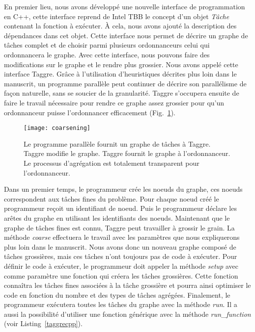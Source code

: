 En premier lieu, nous avons développé une nouvelle interface de programmation en C++, cette interface reprend de Intel TBB le concept d'un objet {\em Tâche} contenant la fonction à exécuter.
%
\`A cela, nous avons ajouté la description des dépendances dans cet objet.
%
Cette interface nous permet de décrire un graphe de tâches complet et de choisir parmi plusieurs ordonnanceurs celui qui ordonnancera le graphe.
%
Avec cette interface, nous pouvons faire des modifications sur le graphe et le rendre plus grossier.
%
Nous avons appelé cette interface Taggre.
%
Grâce à l'utilisation d'heuristiques décrites plus loin dans le manuscrit, un programme parallèle peut continuer de décrire son parallélisme de façon naturelle, sans se soucier de la granularité.
%
Taggre s'occupera ensuite de faire le travail nécessaire pour rendre ce graphe assez grossier pour qu'un ordonnanceur puisse l'ordonnancer efficacement (Fig.~\ref{fig:coarsening}).
\begin{figure}
  \centering
  \texttt{[image: coarsening]}
  \caption{Le programme parallèle fournit un graphe de tâches à Taggre. Taggre modifie le graphe. Taggre fournit le graphe à l'ordonnanceur. Le processus d'agrégation est totalement transparent pour l'ordonnanceur.}
  \label{fig:coarsening}
\end{figure}






Dans un premier temps, le programmeur crée les noeuds du graphe, ces noeuds correspondent aux tâches fines du problème.
%
Pour chaque noeud créé le programmeur reçoit un identifiant de noeud.
%
Puis le programmeur déclare les arêtes du graphe en utilisant les identifiants des noeuds.
%
Maintenant que le graphe de tâches fines est connu, Taggre peut travailler à grossir le grain.
%
La méthode {\em coarse} effectuera le travail avec les paramètres que nous expliquerons plus loin dans le manuscrit.
%
Nous avons donc un nouveau graphe composé de tâches grossières, mais ces tâches n'ont toujours pas de code à exécuter.
%
Pour définir le code à exécuter, le programmeur doit appeler la méthode {\em setup} avec comme paramètre une fonction qui créera les tâches grossières.
%
Cette fonction connaîtra les tâches fines associées à la tâche grossière et pourra ainsi optimiser le code en fonction du nombre et des types de tâches agrégées.
%
Finalement, le programmeur exécutera toutes les tâches du graphe avec la méthode {\em run}.
%
Il a aussi la possibilité d'utiliser une fonction générique avec la méthode {\em run\_function} (voir Listing~\ref{taggrecpp}).
